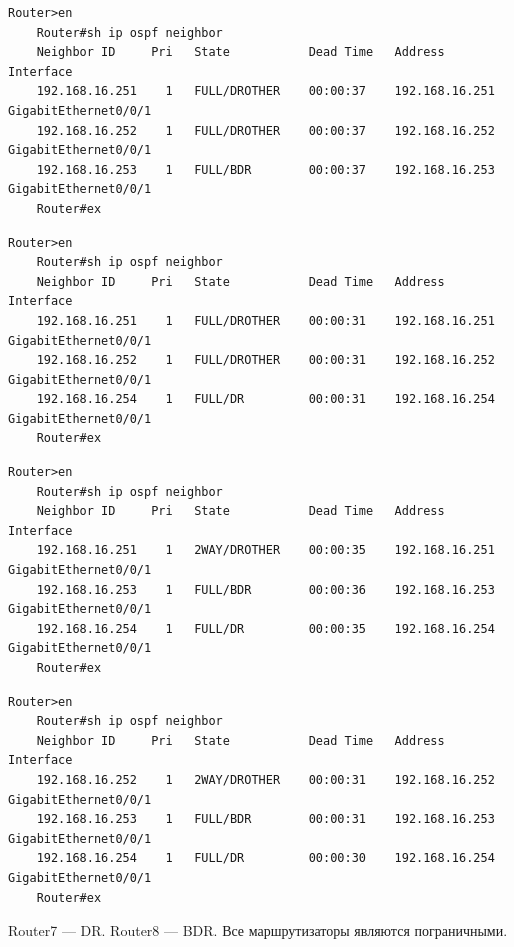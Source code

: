\documentclass[a4paper,oneside,12pt]{extreport}
\begin{document}
\begin{lstlisting}[gobble=8, caption=\code{Router7\# show ip ospf neighbor}]
	Router>en
	Router#sh ip ospf neighbor
	Neighbor ID     Pri   State           Dead Time   Address         Interface
	192.168.16.251    1   FULL/DROTHER    00:00:37    192.168.16.251  GigabitEthernet0/0/1
	192.168.16.252    1   FULL/DROTHER    00:00:37    192.168.16.252  GigabitEthernet0/0/1
	192.168.16.253    1   FULL/BDR        00:00:37    192.168.16.253  GigabitEthernet0/0/1
	Router#ex
\end{lstlisting}

\begin{lstlisting}[gobble=8, caption=\code{Router8\#  show ip ospf neighbor}]
	Router>en
	Router#sh ip ospf neighbor
	Neighbor ID     Pri   State           Dead Time   Address         Interface
	192.168.16.251    1   FULL/DROTHER    00:00:31    192.168.16.251  GigabitEthernet0/0/1
	192.168.16.252    1   FULL/DROTHER    00:00:31    192.168.16.252  GigabitEthernet0/0/1
	192.168.16.254    1   FULL/DR         00:00:31    192.168.16.254  GigabitEthernet0/0/1
	Router#ex
\end{lstlisting}

\begin{lstlisting}[gobble=8, caption=\code{Router9\# show ip ospf neighbor}]
	Router>en
	Router#sh ip ospf neighbor
	Neighbor ID     Pri   State           Dead Time   Address         Interface
	192.168.16.251    1   2WAY/DROTHER    00:00:35    192.168.16.251  GigabitEthernet0/0/1
	192.168.16.253    1   FULL/BDR        00:00:36    192.168.16.253  GigabitEthernet0/0/1
	192.168.16.254    1   FULL/DR         00:00:35    192.168.16.254  GigabitEthernet0/0/1
	Router#ex
\end{lstlisting}

\begin{lstlisting}[gobble=8, caption=\code{Router10\#  show ip ospf neighbor}]
	Router>en
	Router#sh ip ospf neighbor
	Neighbor ID     Pri   State           Dead Time   Address         Interface
	192.168.16.252    1   2WAY/DROTHER    00:00:31    192.168.16.252  GigabitEthernet0/0/1
	192.168.16.253    1   FULL/BDR        00:00:31    192.168.16.253  GigabitEthernet0/0/1
	192.168.16.254    1   FULL/DR         00:00:30    192.168.16.254  GigabitEthernet0/0/1
	Router#ex
\end{lstlisting}

Router7 — DR.
Router8 — BDR.
Все маршрутизаторы являются пограничными.
\end{document}
